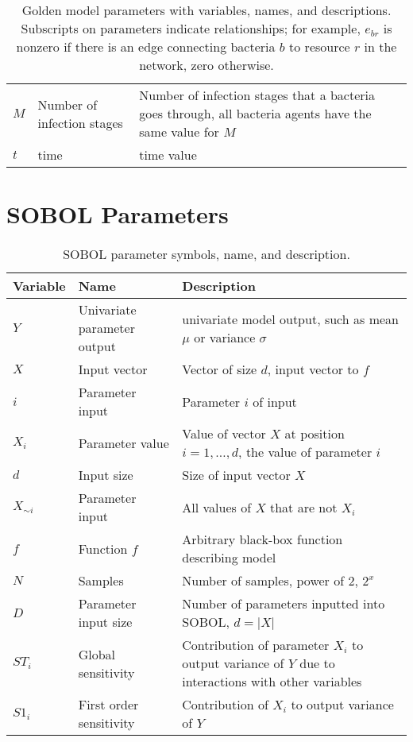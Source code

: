 \begin{table}[h!]
\begin{tabularx}{\textwidth}{l l X}
        $M$ & Number of infection stages & Number of infection stages that a bacteria goes through, all bacteria agents have the same value for $M$\\
        $t$ & time & time value \\
        \bottomrule
    \end{tabularx}\newline
    \caption{
        Golden model parameters with variables, names, and descriptions. 
        Subscripts on parameters indicate relationships; for example, $e_{b r}$ is nonzero if there is an edge connecting bacteria $b$ to resource $r$ in the network, zero otherwise.
    }
    \label{tab:appendixA:parameter_table_simple_golden_model}
\end{table}


\section{SOBOL Parameters}
\begin{table}[h!]
    \small %
    \centering
    \begin{tabularx}{\textwidth}{l l X}
        \toprule
        \textbf{Variable} & \textbf{Name} & \textbf{Description} \\
        \midrule
        $Y$ & Univariate parameter output & univariate model output, such as mean $\mu$ or variance $\sigma$ \\
        $X$ & Input vector & Vector of size $d$, input vector to $f$ \\
        $i$ & Parameter input & Parameter $i$ of input \\
        $X_i$ & Parameter value & Value of vector $X$ at position $i=1, \dots, d$, the value of parameter $i$ \\
        $d$ & Input size & Size of input vector $X$ \\
        $X_{\sim i}$ & Parameter input & All values of $X$ that are not $X_i$ \\
        $f$ & Function $f$ & Arbitrary black-box function describing model \\
        $N$ & Samples & Number of samples, power of 2, $2^x$ \\
        $D$ & Parameter input size & Number of parameters inputted into SOBOL, $d=|X|$ \\
        $ST_i$ & Global sensitivity & Contribution of parameter $X_i$ to output variance of $Y$ due to interactions with other variables \\
        $S1_i$ & First order sensitivity & Contribution of $X_i$ to output variance of $Y$ \\
        \bottomrule
    \end{tabularx} \newline
    \caption{
        SOBOL parameter symbols, name, and description.
    }
    \label{tab:appendixA:parameter_table_SOBOL}
\end{table}

